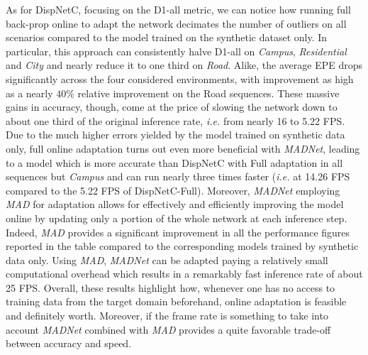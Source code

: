 \documentclass[10pt,twocolumn,letterpaper]{article}
\def\ie{\emph{i.e.}}
\def\netname{\emph{MADNet}}
\def\algoname{\emph{MAD}}
\begin{document}
As for DispNetC, focusing on the D1-all metric, we can notice how running full back-prop online to adapt the network decimates the number of outliers on all scenarios compared to the model trained on the synthetic dataset only. In particular, this approach can consistently halve D1-all on \emph{Campus}, \emph{Residential} and \emph{City} and nearly reduce it to one third on \emph{Road}. Alike, the average EPE drops significantly across the four considered environments, with improvement as high as a nearly $40\%$ relative improvement on the Road sequences. These massive gains in accuracy, though, come at the price of slowing the network down to about one third of the original inference rate, \ie{} from nearly 16 to 5.22 FPS. Due to the much higher errors yielded by the model trained on synthetic data only, full online adaptation turns out even more beneficial with \netname{}, leading to a model which is more accurate than DispNetC with Full adaptation in all sequences but \textit{Campus} and can run nearly three times faster (\ie{} at 14.26 FPS compared to the 5.22 FPS of DispNetC-Full). Moreover, \netname{} employing \algoname{} for adaptation allows for effectively and efficiently improving the model online by updating only a portion of the whole network at each inference step. Indeed, \algoname{} provides a significant improvement in all the performance figures reported in the table compared to the corresponding models trained by synthetic data only. 
Using \algoname{},  \netname{}  can be adapted paying a relatively small computational overhead which results in a remarkably fast inference rate of about 25 FPS. Overall, these results highlight how, whenever one has no access to training data from the target domain beforehand, online adaptation is feasible and definitely worth. Moreover, if the frame rate is something to take into account \netname{} combined with \algoname{} provides a quite favorable trade-off between accuracy and speed.       
\end{document}
